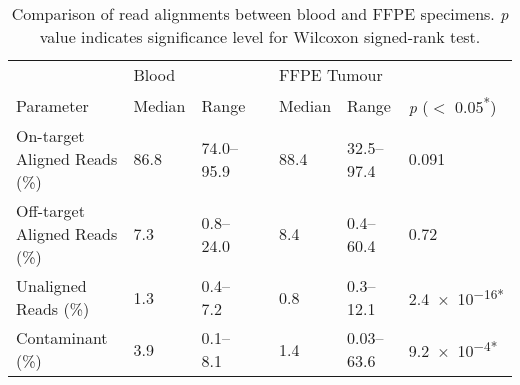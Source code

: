 \begin{table}[H]
\caption{Comparison of read alignments between blood and FFPE specimens. \textit{p} value indicates significance level for Wilcoxon signed-rank test.}
\label{tbl:alignment}
      \begin{tabular}{lllllll}
        \hline
				\multicolumn{1}{l}{ }
				&
				\multicolumn{2}{l}{Blood}
				&&
				\multicolumn{2}{l}{FFPE Tumour}
				&
				\multicolumn{1}{l}{ } \\
				\cline{2-3}\cline{5-6}
        Parameter & Median & Range && Median & Range & \textit{p} ($<$ 0.05\textsuperscript{*})
				\\
				\hline
				On-target Aligned Reads (\%) & 86.8 & 74.0--95.9 && 88.4 & 32.5--97.4 & \num{0.091}
				\\
				Off-target Aligned Reads (\%) & 7.3 & 0.8--24.0 && 8.4 & 0.4--60.4 & \num{0.72}
				\\
				Unaligned Reads (\%) & 1.3 & 0.4--7.2 && 0.8 & 0.3--12.1 & \num{2.4e-16}\textsuperscript{*}
				\\
				Contaminant (\%) & 3.9 & 0.1--8.1 && 1.4 & 0.03--63.6 &
				\num{9.2e-4}\textsuperscript{*}
				\\
				\hline
      \end{tabular} \\
\end{table}


